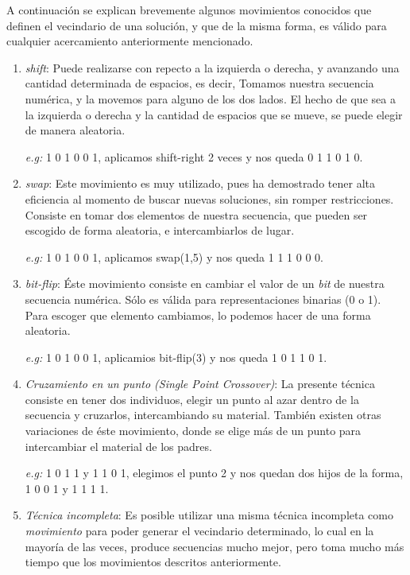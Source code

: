A continuación se explican brevemente algunos movimientos conocidos que definen el vecindario de 
una solución, y que de la misma forma, es válido para cualquier acercamiento anteriormente
mencionado.
\begin{enumerate}
	\item \emph{shift}: Puede realizarse con repecto a la izquierda o derecha, y avanzando una cantidad determinada de espacios,
		es decir, Tomamos nuestra secuencia numérica, y la movemos para alguno de los dos lados. El hecho de que sea a la izquierda
		o derecha y la cantidad de espacios que se mueve, se puede elegir de manera aleatoria.

		\emph{e.g:} 1 0 1 0 0 1, aplicamos shift-right 2 veces y nos queda 0 1 1 0 1 0.
	\item \emph{swap}: Este movimiento es muy utilizado, pues ha demostrado tener alta eficiencia al momento de buscar
		nuevas soluciones, sin romper restricciones. Consiste en tomar dos elementos de nuestra secuencia, que pueden ser escogido
		de forma aleatoria, e intercambiarlos
		de lugar.

		\emph{e.g:} 1 0 1 0 0 1, aplicamos swap(1,5) y nos queda 1 1 1 0 0 0.
	\item \emph{bit-flip}: Éste movimiento consiste en cambiar el valor de un \emph{bit} de nuestra secuencia numérica.
			Sólo es válida para representaciones binarias (0 o 1). Para escoger que elemento cambiamos, lo podemos hacer de una forma
			aleatoria.
		
		\emph{e.g:} 1 0 1 0 0 1, aplicamios bit-flip(3) y nos queda 1 0 1 1 0 1.
	\item \emph{Cruzamiento en un punto (Single Point Crossover)}: La presente técnica consiste en tener dos individuos,
		elegir un punto al azar dentro de la secuencia y cruzarlos, intercambiando su material. También existen otras variaciones
		de éste movimiento, donde se elige más de un punto para intercambiar el material de los padres.

		\emph{e.g:} 1 0 1 1 y 1 1 0 1, elegimos el punto 2 y nos quedan dos hijos de la forma, 1 0 0 1 y 1 1 1 1.
				
	\item \emph{Técnica incompleta}: Es posible utilizar una misma técnica incompleta como \emph{movimiento} para poder generar
		el vecindario determinado, lo cual en la mayoría de las veces, produce secuencias mucho mejor, pero toma mucho más tiempo
		que los movimientos descritos anteriormente.
\end{enumerate}

